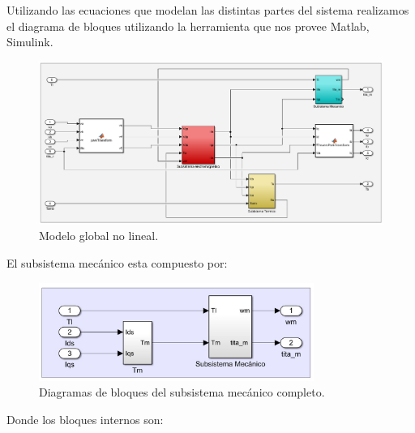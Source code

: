 \documentclass{article}
\begin{document}

Utilizando las ecuaciones que modelan las distintas partes del sistema realizamos el 
diagrama de bloques utilizando la herramienta que nos provee Matlab, Simulink.

\begin{figure}[H]
    \centering
    \includegraphics[width=1\textwidth]{no_lineal.png}
    \caption{Modelo global no lineal.}
\end{figure}

El subsistema mecánico esta compuesto por:

\begin{figure}[H]
    \centering
    \includegraphics[width=0.8\textwidth]{sub_mecanico.png}
    \caption{Diagramas de bloques del subsistema mecánico completo.}
\end{figure}

Donde los bloques internos son:
\end{document}
